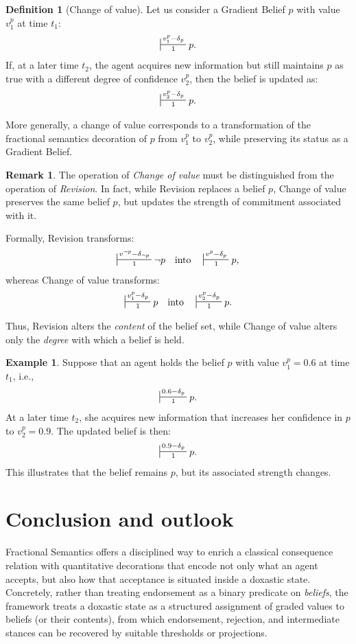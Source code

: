 \documentclass[12pt,a4paper,reqno]{amsart}
\theoremstyle{definition}
\newtheorem{definition}[theorem]{Definition}
\newtheorem{example}[theorem]{Example}
\newtheorem{remark}[theorem]{Remark}
\begin{document}
\begin{definition}[Change of value]
\label{def:changeofvalue}
Let us consider a Gradient Belief $p$ with value $v_1^p$ at time $t_1$:
\[
\sststile{1}{v_1^p - \delta_p} p.
\]
If, at a later time $t_2$, the agent acquires new information but still maintains $p$ as true with a different degree of confidence $v_2^p$, then the belief is updated as:
\[
\sststile{1}{v_2^p - \delta_p} p.
\]

\noindent
More generally, a change of value corresponds to a transformation of the fractional semantics decoration of $p$ from $v_1^p$ to $v_2^p$, while preserving its status as a Gradient Belief.
\end{definition}

\begin{remark}
The operation of \emph{Change of value} must be distinguished from the operation of \emph{Revision}. 
In fact, while Revision replaces a belief $p$, Change of value preserves the same belief $p$, but updates the strength of commitment associated with it. 

\noindent
Formally, Revision transforms:
\[
\sststile{1}{v^{\neg p} - \delta_{\neg p}} \neg p
\quad \text{into} \quad
\sststile{1}{v^{p} - \delta_p} p,
\]
whereas Change of value transforms:
\[
\sststile{1}{v_1^p - \delta_p} p
\quad \text{into} \quad
\sststile{1}{v_2^p - \delta_p} p.
\]

\noindent
Thus, Revision alters the \emph{content} of the belief set, while Change of value alters only the \emph{degree} with which a belief is held.
\end{remark}

\begin{example}
Suppose that an agent holds the belief $p$ with value $v_1^p = 0.6$ at time $t_1$, i.e.,
\[
\sststile{1}{0.6 - \delta_p} p.
\]
At a later time $t_2$, she acquires new information that increases her confidence in $p$ to $v_2^p = 0.9$. 
The updated belief is then:
\[
\sststile{1}{0.9 - \delta_p} p.
\]
This illustrates that the belief remains $p$, but its associated strength changes. 
\end{example}



\section{Conclusion and outlook}
Fractional Semantics offers a disciplined way to enrich a classical consequence relation with quantitative
decorations that encode not only what an agent accepts, but also how that acceptance is situated inside a
doxastic state. Concretely, rather than treating endorsement as a binary predicate on \emph{beliefs}, the
framework treats a doxastic state as a structured assignment of graded values to beliefs (or their
contents), from which endorsement, rejection, and intermediate stances can be recovered by suitable
thresholds or projections.
\end{document}
